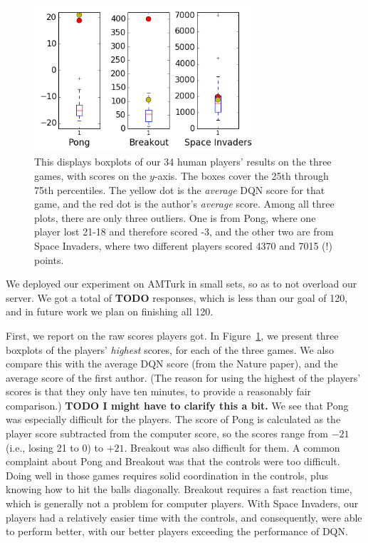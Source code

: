 \documentclass[letterpaper, 10 pt, conference]{ieeeconf}  %
\begin{document}
\begin{figure}[t]
\centering
\includegraphics[width=3.2in]{fig_boxplots_human_results.png}
\caption{This displays boxplots of our 34 human players' results on the three games, with scores on
the $y$-axis. The boxes cover the 25th through 75th percentiles. The yellow dot is the
\emph{average} DQN score for that game, and the red dot is the author's \emph{average} score. Among
all three plots, there are only three outliers. One is from Pong, where one player lost 21-18 and
therefore scored -3, and the other two are from Space Invaders, where two different players scored
4370 and 7015 (!) points.}
\label{fig:human_results}
\end{figure}

We deployed our experiment on AMTurk in small sets, so as to not overload our server. We got a total
of \textbf{TODO} responses, which is less than our goal of 120, and in future work we plan on
finishing all 120.

First, we report on the raw scores players got. In Figure~\ref{fig:human_results}, we present three
boxplots of the players' \emph{highest} scores, for each of the three games. We also compare this
with the average DQN score (from the Nature paper), and the average score of the first author. (The
reason for using the highest of the players' scores is that they only have ten minutes, to provide a
reasonably fair comparison.) \textbf{TODO I might have to clarify this a bit.} We see that Pong was
especially difficult for the players. The score of Pong is calculated as the player score subtracted
from the computer score, so the scores range from $-21$ (i.e., losing 21 to 0) to $+21$. Breakout
was also difficult for them. A common complaint about Pong and Breakout was that the controls were
too difficult. Doing well in those games requires solid coordination in the controls, plus knowing
how to hit the balls diagonally. Breakout requires a fast reaction time, which is generally not a
problem for computer players. With Space Invaders, our players had a relatively easier time with the
controls, and consequently, were able to perform better, with our better players exceeding the
performance of DQN.
\end{document}
